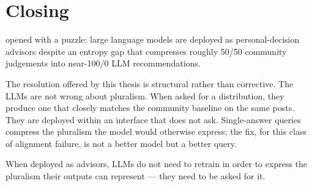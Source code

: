 \section{Closing}
\label{sec:conc_closing}

 opened with a puzzle: large language models
are deployed as personal-decision advisors despite an entropy gap that
compresses roughly 50/50 community judgements into near-100/0 LLM
recommendations.

The resolution offered by this thesis is structural rather than
corrective. The LLMs are not wrong about pluralism. When asked for a
distribution, they produce one that closely matches the community
baseline on the same posts. They are deployed within an interface
that does not ask. Single-answer queries compress the pluralism the
model would otherwise express; the fix, for this class of alignment
failure, is not a better model but a better query.

When deployed as advisors, LLMs do not need to retrain in order to
express the pluralism their outputs can represent --- they need to be
asked for it.
